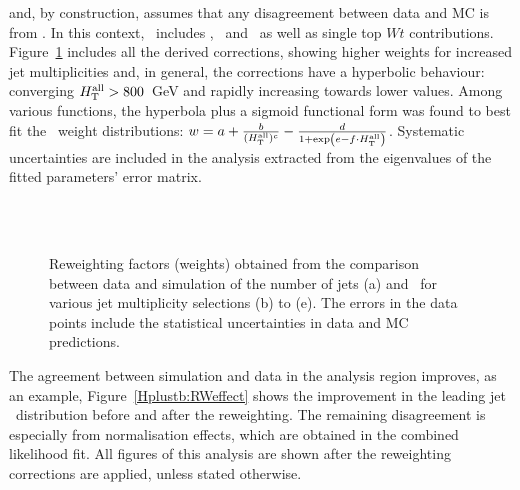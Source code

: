 and, by construction, assumes that any disagreement between data and MC is from \ttbar. In this context, \ttbar\ includes \ttb, \ttc\ and \ttl\ as well as single top $Wt$ contributions.\\

Figure~\ref{Hplustb:RWfactors} includes all the derived corrections, showing higher weights for increased jet multiplicities and, in general, the \HTall corrections have a hyperbolic behaviour: converging $H_{\text{T}}^{\text{all}} > 800$~GeV and rapidly increasing towards lower values. Among various functions, the hyperbola plus a sigmoid functional form was found to best fit the \HTall\ weight distributions: $w=a+\frac{b}{(H_{\text{T}}^{\text{all}})^c} - \frac{d}{1+\exp(e-f\cdot H_{\text{T}}^{\text{all}})}$. Systematic uncertainties are included in the analysis extracted from the eigenvalues of the fitted parameters' error matrix.\\

\begin{figure}[htb]
    \RawFloats
    \begin{center}
     \\ 
      \\
    \caption{Reweighting factors (weights) obtained from the comparison between data and simulation of the number of jets (a) and \HTall\ for various jet multiplicity selections (b) to (e).
    The errors in the data points include the statistical uncertainties in data and MC predictions.}
    \label{Hplustb:RWfactors}
\end{center}
\end{figure}

The agreement between simulation and data in the analysis region improves, as an example, Figure~\ref{Hplustb:RWeffect} shows the improvement in the leading jet \pT\ distribution before and after the reweighting. The remaining disagreement is especially from normalisation effects, which are obtained in the combined likelihood fit. All figures of this analysis are shown after the reweighting corrections are applied, unless stated otherwise.

